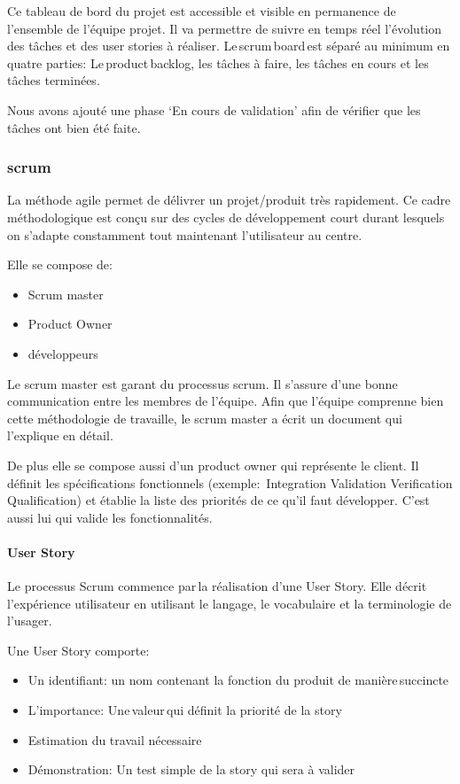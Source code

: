

Ce tableau de bord du projet est accessible et visible en permanence de l’ensemble de l'équipe projet.
Il va permettre de suivre en temps réel l'évolution des tâches et des user stories à réaliser.
Le scrum board est séparé au minimum en quatre parties: Le product backlog, les tâches à faire, les tâches en cours et les tâches terminées.

Nous avons ajouté une phase `En cours de validation' afin de vérifier que les tâches ont bien été faite.


\subsubsection{scrum}
La méthode agile permet de délivrer un projet/produit très rapidement.
Ce cadre méthodologique est conçu sur des cycles de développement court durant lesquels on s'adapte constamment tout maintenant l'utilisateur au centre. 

Elle se compose de:
\begin{itemize}
\item Scrum master
\item Product Owner
\item développeurs
\end{itemize}


Le scrum master est garant du processus scrum.
Il s'assure d’une bonne communication entre les membres de l'équipe.
Afin que l'équipe comprenne bien cette méthodologie de travaille, le scrum master a écrit un document qui l'explique en détail.

De plus elle se compose aussi d'un product owner qui représente le client.
Il définit les spécifications fonctionnels (exemple:  Integration Validation Verification Qualification) et établie la liste des priorités de ce qu'il faut développer.
C'est aussi lui qui valide les fonctionnalités. 

\paragraph{User Story}
Le processus Scrum commence par la réalisation d'une User Story.
Elle décrit l’expérience utilisateur en utilisant le langage, le vocabulaire et la terminologie de l’usager. 

Une User Story comporte:
\begin{itemize}
\item Un identifiant: un nom contenant la fonction du produit de manière succincte
\item L'importance: Une valeur qui définit la priorité de la story
\item Estimation du travail nécessaire
\item Démonstration: Un test simple de la story qui sera à valider
\end{itemize}


